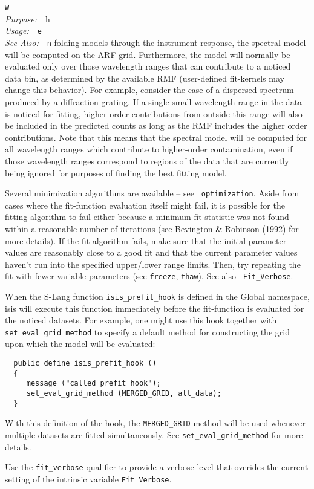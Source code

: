 \documentclass{book}
\makeatletter
\newif\ifpdf
\newenvironment{isisfunction}[4]%
{\index{{#1}@{\tt #1}}%
  \ifpdf
  \else
     \addcontentsline{toc}{subsection}{{#1} -- {#2}}
  \fi
  \vbox{
          \vspace*{\baselineskip}
          {\LARGE\tt #1}\vspace*{\baselineskip}\\
          {{\it Purpose:}~~{#2}}\\
          {{\it Usage:}~~{\tt #3}}\\
          {{\it See Also:}~~{\tt #4}}
       }
}%
{ }
\makeatother
\begin{document}
{\begin{isisfunction}
When folding models through the instrument response, the spectral
model will be computed on the ARF grid. Furthermore, the model
will normally be evaluated only over those wavelength ranges that
can contribute to a noticed data bin, as determined by the
available RMF (user-defined fit-kernels may change this behavior).
For example, consider the case of a dispersed spectrum produced by
a diffraction grating. If a single small wavelength range in the
data is noticed for fitting, higher order contributions from
outside this range will also be included in the predicted counts
as long as the RMF includes the higher order contributions. Note
that this means that the spectral model will be computed for all
wavelength ranges which contribute to higher-order contamination,
even if those wavelength ranges correspond to regions of the data
that are currently being ignored for purposes of finding the best
fitting model.

Several minimization algorithms are available -- see {\tt
optimization}. Aside from cases where the fit-function
evaluation itself might fail, it is possible for the fitting
algorithm to fail either because a minimum fit-statistic was
not found within a reasonable number of iterations (see
Bevington \& Robinson (1992) for more details).  If the fit
algorithm fails, make sure that the initial parameter values
are reasonably close to a good fit and that the current
parameter values haven't run into the specified upper/lower
range limits. Then, try repeating the fit with fewer variable
parameters (see {\tt freeze}, {\tt thaw}). See also {\tt
Fit\_Verbose}.

When the S-Lang function \verb|isis_prefit_hook| is defined in
the Global namespace, isis will execute this function
immediately before the fit-function is evaluated for the
noticed datasets. For example, one might use this hook together
with \verb|set_eval_grid_method| to specify a default method
for constructing the grid upon which the model will be
evaluated:
\begin{verbatim}
  public define isis_prefit_hook ()
  {
     message ("called prefit hook");
     set_eval_grid_method (MERGED_GRID, all_data);
  }
\end{verbatim}
With this definition of the hook, the \verb|MERGED_GRID|
method will be used whenever multiple datasets are fitted
simultaneously. See \verb|set_eval_grid_method| for
more details.

Use the \verb|fit_verbose| qualifier to provide a verbose
level that overides the current setting of the
intrinsic variable \verb|Fit_Verbose|.


\end{isisfunction}}
\end{document}
